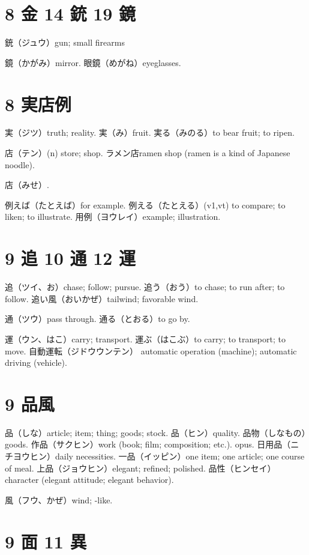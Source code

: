 \section{8 金 14 銃 19 鏡}

銃（ジュウ）gun; small firearms

鏡（かがみ）mirror.
眼鏡（めがね）eyeglasses.

\section{8 実店例}

実（ジツ）truth; reality.
実（み）fruit.
実る（みのる）to bear fruit; to ripen.

店（テン）(n) store; shop.
ラメン店ramen shop (ramen is a kind of Japanese noodle).

店（みせ）.

例えば（たとえば）for example.
例える（たとえる）(v1,vt)
to compare; to liken; to illustrate.
用例（ヨウレイ）example; illustration.

\section{9 追 10 通 12 運}

追（ツイ、お）chase; follow; pursue.
追う（おう）to chase; to run after; to follow.
追い風（おいかぜ）tailwind; favorable wind.

通（ツウ）pass through.
通る（とおる）to go by.

運（ウン、はこ）carry; transport.
運ぶ（はこぶ）to carry; to transport; to move.
自動運転（ジドウウンテン）
automatic operation (machine); automatic driving (vehicle).

\section{9 品風}

品（しな）article; item; thing; goods; stock.
品（ヒン）quality.
品物（しなもの）goods.
作品（サクヒン）work (book; film; composition; etc.). opus.
日用品（ニチヨウヒン）daily necessities.
一品（イッピン）one item; one article; one course of meal.
上品（ジョウヒン）elegant; refined; polished.
品性（ヒンセイ）character (elegant attitude; elegant behavior).

風（フウ、かぜ）wind; -like.

\section{9 面 11 異}

